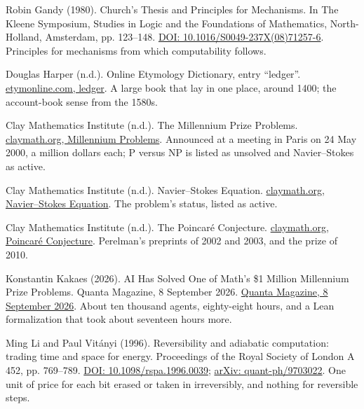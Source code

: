 \documentclass[11pt,twoside]{article}
\theoremstyle{thielethm}
\theoremstyle{thieledef}
\theoremstyle{thieledef}
\theoremstyle{thieledef}
\theoremstyle{thielethm}
\theoremstyle{thieleobs}
\theoremstyle{thielethm}
\begin{document}
\noindent Robin Gandy (1980). Church's Thesis and Principles for Mechanisms. In The Kleene Symposium, Studies in Logic and the Foundations of Mathematics, North-Holland, Amsterdam, pp. 123--148. \href{https://doi.org/10.1016/S0049-237X(08)71257-6}{DOI: 10.1016/S0049-237X(08)71257-6}. Principles for mechanisms from which computability follows.
\par\medskip

\noindent Douglas Harper (n.d.). Online Etymology Dictionary, entry ``ledger''. \href{https://www.etymonline.com/word/ledger}{etymonline.com, ledger}. A large book that lay in one place, around 1400; the account-book sense from the 1580s.
\par\medskip

\noindent Clay Mathematics Institute (n.d.). The Millennium Prize Problems. \href{https://www.claymath.org/millennium-problems/}{claymath.org, Millennium Problems}. Announced at a meeting in Paris on 24 May 2000, a million dollars each; P versus NP is listed as unsolved and Navier--Stokes as active.
\par\medskip

\noindent Clay Mathematics Institute (n.d.). Navier--Stokes Equation. \href{https://www.claymath.org/millennium/navier-stokes-equation/}{claymath.org, Navier--Stokes Equation}. The problem's status, listed as active.
\par\medskip

\noindent Clay Mathematics Institute (n.d.). The Poincar\'e Conjecture. \href{https://www.claymath.org/millennium/poincare-conjecture/}{claymath.org, Poincar\'e Conjecture}. Perelman's preprints of 2002 and 2003, and the prize of 2010.
\par\medskip

\noindent Konstantin Kakaes (2026). AI Has Solved One of Math's \$1 Million Millennium Prize Problems. Quanta Magazine, 8 September 2026. \href{https://www.quantamagazine.org/ai-has-solved-one-of-maths-1-million-millennium-prize-problems-20260908/}{Quanta Magazine, 8 September 2026}. About ten thousand agents, eighty-eight hours, and a Lean formalization that took about seventeen hours more.
\par\medskip

\noindent Ming Li and Paul Vit\'anyi (1996). Reversibility and adiabatic computation: trading time and space for energy. Proceedings of the Royal Society of London A 452, pp. 769--789. \href{https://doi.org/10.1098/rspa.1996.0039}{DOI: 10.1098/rspa.1996.0039}; \href{https://arxiv.org/abs/quant-ph/9703022}{arXiv: quant-ph/9703022}. One unit of price for each bit erased or taken in irreversibly, and nothing for reversible steps.
\par\medskip
\end{document}
